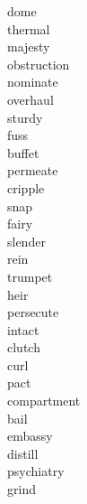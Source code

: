 \documentclass[a4paper, 11pt]{ctexart}
\begin{document}
\begin{multicols*}{3}
\begin{description}
\item[dome]

\item[thermal]

\item[majesty]

\item[obstruction]

\item[nominate]

\item[overhaul]

\item[sturdy]

\item[fuss]

\item[buffet]

\item[permeate]

\item[cripple]

\item[snap]

\item[fairy]

\item[slender]

\item[rein]

\item[trumpet]

\item[heir]

\item[persecute]

\item[intact]

\item[clutch]

\item[curl]

\item[pact]

\item[compartment]

\item[bail]

\item[embassy]

\item[distill]

\item[psychiatry]

\item[grind]


\end{description}
\end{multicols*}
\end{document}
